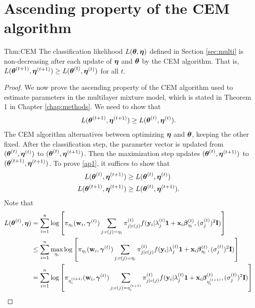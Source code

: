 \chapter{Ascending property of the CEM algorithm}
\label{append:2}

\begin{reptheorem}{Thm:CEM}
The classification likelihood $L(\boldsymbol\theta,\boldsymbol\eta)$ defined in Section \ref{sec:multi} is non-decreasing after each update of $\boldsymbol\eta$ and $\boldsymbol\theta$ by the CEM algorithm. That is, $L(\boldsymbol\theta^{(t+1)},\boldsymbol\eta^{(t+1)}) \geq L(\boldsymbol\theta^{(t)},\boldsymbol\eta^{(t)})$ for all $t$.
\end{reptheorem}

\begin{proof}
We now prove the ascending property of the CEM algorithm used to estimate parameters in the multilayer mixture model, which is stated in Theorem 1 in Chapter \ref{chap:methods}. We need to show that
    \begin{align}\label{ap1}L(\boldsymbol\theta^{(t+1)},\boldsymbol\eta^{(t+1)})\geq L(\boldsymbol\theta^{(t)},\boldsymbol\eta^{(t)}).\end{align}
    The CEM algorithm alternatives between optimizing $\boldsymbol\eta$ and $\boldsymbol\theta$, keeping the other fixed. After the classification step, the parameter vector is updated from $(\boldsymbol\theta^{(t)},\boldsymbol\eta^{(t)})$ to $(\boldsymbol\theta^{(t)},\boldsymbol\eta^{(t+1)})$. Then the maximization step updates $(\boldsymbol\theta^{(t)},\boldsymbol\eta^{(t+1)})$ to $(\boldsymbol\theta^{(t+1)},\boldsymbol\eta^{(t+1)})$. To prove \ref{ap1}, it suffices to show that
    \begin{align*}
    L(\boldsymbol\theta^{(t)},\boldsymbol\eta^{(t+1)})&\geq L(\boldsymbol\theta^{(t)},\boldsymbol\eta^{(t)})\\
    L(\boldsymbol\theta^{(t+1)},\boldsymbol\eta^{(t+1)})&\geq L(\boldsymbol\theta^{(t)},\boldsymbol\eta^{(t+1)}).
    \end{align*}
    Note that 
    \begin{align*}
 L(\BS\theta^{(t)},\BS\eta)&=\sum^{n}_{i=1}\log\left[\pi_{\eta_{i}}(\B w_{i},\BS \gamma^{(t)})\sum_{j:c(j)=\eta_{i}}\pi_{j|c(j)}^{(t)}f(\B y_{i}|\lambda_{j}^{(t)}\B 1+\B x_{i}\BS\beta^{(t)}_{\eta_{i}},(\sigma^{(t)}_{j})^{2}\B I)\right]\\
 &\leq \sum^{n}_{i=1}\max_{\eta_{i}}\log\left[\pi_{\eta_{i}}(\B w_{i},\BS \gamma^{(t)})\sum_{j:c(j)=\eta_{i}}\pi_{j|c(j)}^{(t)}f(\B y_{i}|\lambda_{j}^{(t)}\B 1+\B x_{i}\BS\beta^{(t)}_{\eta_{i}},(\sigma^{(t)}_{j})^{2}\B I)\right]\\
  &= \sum^{n}_{i=1}\log\left[\pi_{\eta^{(t+1)}_{i}}(\B w_{i},\BS \gamma^{(t)})\sum_{j:c(j)=\eta^{(t+1)}_{i}}\pi_{j|c(j)}^{(t)}f(\B y_{i}|\lambda_{j}^{(t)}\B 1+\B x_{i}\BS\beta^{(t)}_{\eta^{(t+1)}_{i}},(\sigma^{(t)}_{j})^{2}\B I)\right]\\

\end{align*}
\end{proof}
